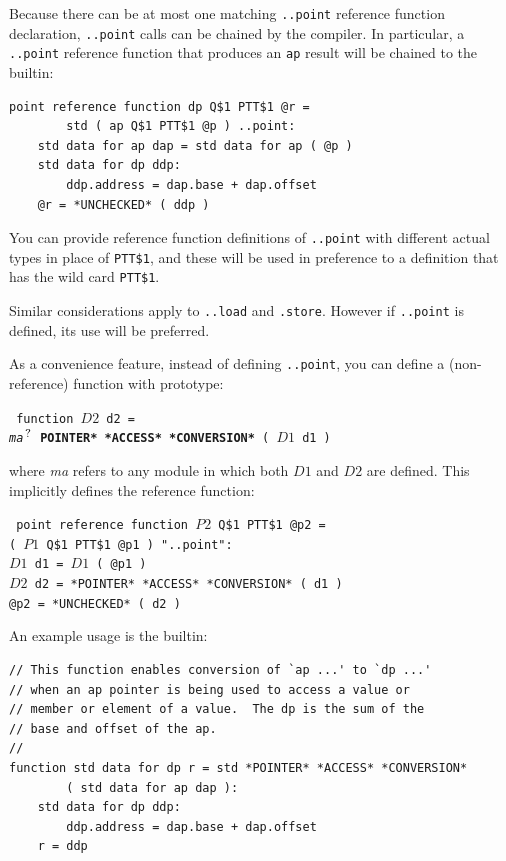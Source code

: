 \documentclass[12pt]{article}
\newcommand{\QMARK}{{$^{\,\mbox{\footnotesize ?}}$}}
\newcommand{\ttkey}[1]{{\tt \bfseries #1}}
\newenvironment{indpar}[1][0.3in]%
	{\begin{list}{}%
		     {\setlength{\itemsep}{0in}%
		      \setlength{\topsep}{0in}%
		      \setlength{\parsep}{1ex}%
		      \setlength{\labelwidth}{#1}%
		      \setlength{\leftmargin}{#1}%
		      \addtolength{\leftmargin}{\labelsep}}%
	 \item}%
	{\end{list}}
\begin{document}
Because there can be at most one matching {\tt ..point} reference function
declaration, {\tt ..point} calls can be chained by the compiler.  In particular,
a {\tt ..point} reference function that produces an {\tt ap} result will
be chained to the builtin:
\begin{indpar}\begin{verbatim}
point reference function dp Q$1 PTT$1 @r =
        std ( ap Q$1 PTT$1 @p ) ..point:
    std data for ap dap = std data for ap ( @p )
    std data for dp ddp:
        ddp.address = dap.base + dap.offset
    @r = *UNCHECKED* ( ddp )
\end{verbatim}\end{indpar}

You can provide reference function definitions of {\tt ..point}
with different actual
types in place of {\tt PTT\$1}, and these will be used in preference
to a definition that has the wild card {\tt PTT\$1}.

Similar considerations apply to {\tt ..load} and {\tt .store}.  However
if {\tt ..point} is defined, its use will be preferred.

As a convenience feature, instead of defining {\tt ..point}, you
can define a (non-reference) function with prototype:
\begin{indpar} \tt
function $D2$ d2 = \\
\hspace*{4em} {\em ma}\QMARK{} \ttkey{*POINTER* *ACCESS* *CONVERSION*}
		( $D1$ d1 )
\end{indpar}
where {\em ma} refers to any module in which both $D1$ and $D2$ are defined.
This implicitly defines the reference function:
\begin{indpar} \tt
point reference function $P2$ Q\$1 PTT\$1 @p2 = \\
\hspace*{1in}( $P1$ Q\$1 PTT\$1 @p1 ) "..point": \\
\hspace*{0.3in}$D1$ d1 = $D1$ ( @p1 ) \\
\hspace*{0.3in}$D2$ d2 = *POINTER* *ACCESS* *CONVERSION* ( d1 ) \\
\hspace*{0.3in}@p2 = *UNCHECKED* ( d2 )
\end{indpar}
An example usage is the builtin:
\begin{indpar}\begin{verbatim}
// This function enables conversion of `ap ...' to `dp ...'
// when an ap pointer is being used to access a value or
// member or element of a value.  The dp is the sum of the
// base and offset of the ap.
//
function std data for dp r = std *POINTER* *ACCESS* *CONVERSION*
        ( std data for ap dap ):
    std data for dp ddp:
        ddp.address = dap.base + dap.offset
    r = ddp
\end{verbatim}\end{indpar}
\end{document}

